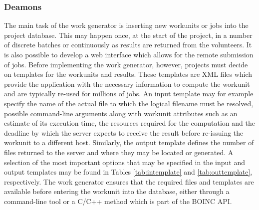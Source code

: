 \subsubsection{Deamons}
The main task of the work generator is inserting new workunits or jobs into the project database. This may happen once, at the start of the project, in a number of discrete batches or continuously as results are returned from the volunteers. It is also possible to develop a web interface which allows for the remote submission of jobs.
Before implementing the work generator, however, projects must decide on templates for the workunits and results. These templates are XML files which provide  the application with the necessary information to compute the workunit and are typically re-used for millions of jobs. 
An input template may for example specify the name of the actual file to which the logical filename must be resolved, possible command-line arguments along with workunit attributes such as an estimate of its execution time, the resources required for the computation and the deadline by which the server expects to receive the result before re-issuing the workunit to a different host.  
Similarly, the output template defines the number of files returned to the server and where they may be located  or generated. A selection of the most important options that may be specified in the input and output templates may be found in Tables \ref{tab:intemplate} and \ref{tab:outtemplate}, respectively. The work generator ensures that the required files and templates are available before entering the workunit into the database, either through a command-line tool or  a C/C++ method which is part of the BOINC API.
